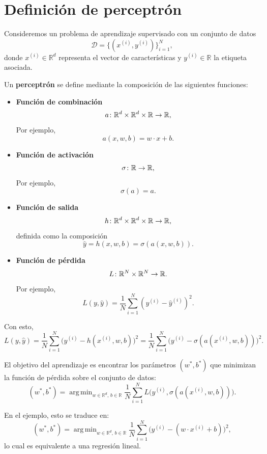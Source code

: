 \documentclass[a4,11pt]{aleph-notas}
\DeclareMathOperator*{\argmin}{arg\,min}
\begin{document}
\encabezado


\section*{Definición de perceptrón}

Consideremos un problema de aprendizaje supervisado con un conjunto de datos
\[
\mathcal{D} = \{(x^{(i)}, y^{(i)})\}_{i=1}^N,
\]
donde \(x^{(i)} \in \mathbb{R}^d\) representa el vector de características y
\(y^{(i)} \in \mathbb{R}\) la etiqueta asociada.

Un \textbf{perceptrón} se define mediante la composición de las siguientes funciones:

\begin{itemize}[leftmargin=*]
    \item \textbf{Función de combinación}
    \[
        a\colon \mathbb{R}^d \times \mathbb{R}^d \times \mathbb{R} \rightarrow \mathbb{R},
    \]
    Por ejemplo,
    \[
        a(x,w,b) = w\cdot  x + b.
    \]

    \item \textbf{Función de activación}
    \[
        \sigma\colon \mathbb{R} \rightarrow \mathbb{R},
    \]
    Por ejemplo,
    \[
        \sigma(a) = a.
    \]

    \item \textbf{Función de salida}
    \[
        h\colon \mathbb{R}^d \times \mathbb{R}^d \times \mathbb{R}  \rightarrow \mathbb{R},
    \]
    definida como la composición
    \[
        \hat y = h(x,w,b) = \sigma (a(x,w,b)).
    \]

    \item \textbf{Función de pérdida}
    \[
        L\colon \mathbb{R}^N \times \mathbb{R}^N \rightarrow \mathbb{R}.
    \]
    Por ejemplo,
    \[
        L(y,\hat y) = \frac{1}{N} \sum_{i=1}^N (y^{(i)} - \hat y^{(i)})^2.
    \]
\end{itemize}

Con esto, 
\[
    L(y, \hat y)
    = \frac{1}{N} \sum_{i=1}^N \bigl(y^{(i)} - h(x^{(i)},w,b)\bigr)^2=
    \frac{1}{N} \sum_{i=1}^N \bigl(y^{(i)} - \sigma(a(x^{(i)},w,b))\bigr)^2.
\]

El objetivo del aprendizaje es encontrar los parámetros \((w^\ast,b^\ast)\)
que minimizan la función de pérdida sobre el conjunto de datos:
\[
    (w^\ast,b^\ast)
    =
    \argmin_{w \in \mathbb{R}^d,\, b \in \mathbb{R}}
    \frac{1}{N} \sum_{i=1}^N L\bigl(y^{(i)}, \sigma(a(x^{(i)},w,b))\bigr).
\]

En el ejemplo, esto se traduce en:
\[
    (w^\ast,b^\ast)
    =
    \argmin_{w \in \mathbb{R}^d,\, b \in \mathbb{R}}
    \frac{1}{N} \sum_{i=1}^N \bigl(y^{(i)} - (w\cdot  x^{(i)} + b)\bigr)^2,
\]
lo cual es equivalente a una regresión lineal.
\end{document}
